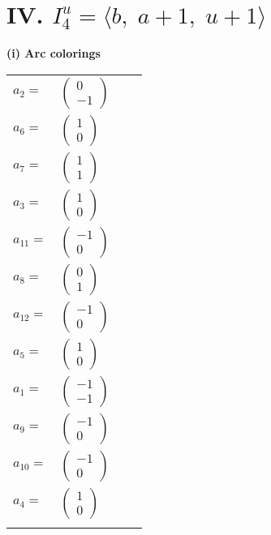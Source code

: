 \documentclass[1p]{elsarticle_modified}
\theoremstyle{definition}
\begin{document}
\centering \section*{IV. $I^u_{4}= \langle b,\;a+1,\;u+1 \rangle$}
\flushleft \textbf{(i) Arc colorings}\\
\begin{tabular}{m{7pt} m{180pt} m{7pt} m{180pt} }
\flushright $a_{2}=$&$\begin{pmatrix}0\\-1\end{pmatrix}$ \\
\flushright $a_{6}=$&$\begin{pmatrix}1\\0\end{pmatrix}$ \\
\flushright $a_{7}=$&$\begin{pmatrix}1\\1\end{pmatrix}$ \\
\flushright $a_{3}=$&$\begin{pmatrix}1\\0\end{pmatrix}$ \\
\flushright $a_{11}=$&$\begin{pmatrix}-1\\0\end{pmatrix}$ \\
\flushright $a_{8}=$&$\begin{pmatrix}0\\1\end{pmatrix}$ \\
\flushright $a_{12}=$&$\begin{pmatrix}-1\\0\end{pmatrix}$ \\
\flushright $a_{5}=$&$\begin{pmatrix}1\\0\end{pmatrix}$ \\
\flushright $a_{1}=$&$\begin{pmatrix}-1\\-1\end{pmatrix}$ \\
\flushright $a_{9}=$&$\begin{pmatrix}-1\\0\end{pmatrix}$ \\
\flushright $a_{10}=$&$\begin{pmatrix}-1\\0\end{pmatrix}$ \\
\flushright $a_{4}=$&$\begin{pmatrix}1\\0\end{pmatrix}$\\&\end{tabular}
\end{document}
